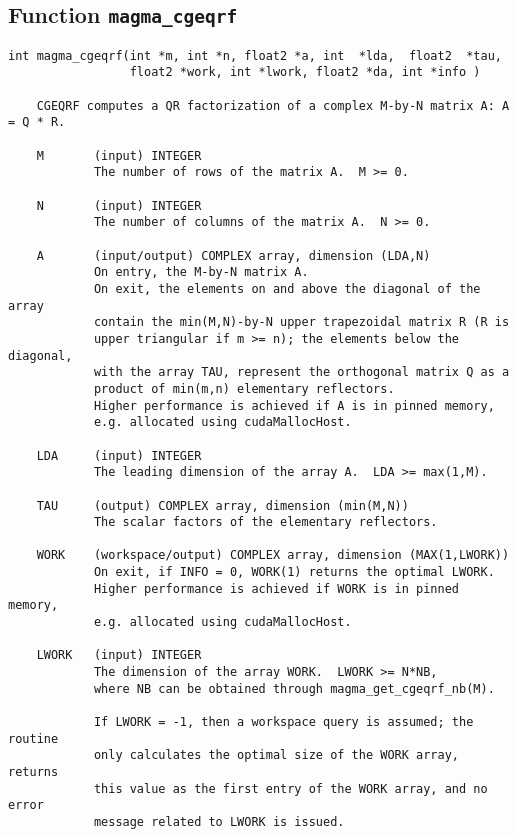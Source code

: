 \documentclass[10pt]{book}
\begin{document}
\subsection{Function {\tt {\bf magma\_cgeqrf}}}
\begin{verbatim}
int magma_cgeqrf(int *m, int *n, float2 *a, int  *lda,  float2  *tau,
                 float2 *work, int *lwork, float2 *da, int *info )
   
    CGEQRF computes a QR factorization of a complex M-by-N matrix A: A = Q * R.   

    M       (input) INTEGER   
            The number of rows of the matrix A.  M >= 0.   

    N       (input) INTEGER   
            The number of columns of the matrix A.  N >= 0.   

    A       (input/output) COMPLEX array, dimension (LDA,N)   
            On entry, the M-by-N matrix A.   
            On exit, the elements on and above the diagonal of the array   
            contain the min(M,N)-by-N upper trapezoidal matrix R (R is   
            upper triangular if m >= n); the elements below the diagonal,   
            with the array TAU, represent the orthogonal matrix Q as a   
            product of min(m,n) elementary reflectors.   
            Higher performance is achieved if A is in pinned memory, 
            e.g. allocated using cudaMallocHost.

    LDA     (input) INTEGER   
            The leading dimension of the array A.  LDA >= max(1,M).   

    TAU     (output) COMPLEX array, dimension (min(M,N))   
            The scalar factors of the elementary reflectors.   

    WORK    (workspace/output) COMPLEX array, dimension (MAX(1,LWORK))   
            On exit, if INFO = 0, WORK(1) returns the optimal LWORK.   
            Higher performance is achieved if WORK is in pinned memory, 
            e.g. allocated using cudaMallocHost.

    LWORK   (input) INTEGER   
            The dimension of the array WORK.  LWORK >= N*NB, 
            where NB can be obtained through magma_get_cgeqrf_nb(M).   

            If LWORK = -1, then a workspace query is assumed; the routine   
            only calculates the optimal size of the WORK array, returns   
            this value as the first entry of the WORK array, and no error   
            message related to LWORK is issued.


\end{verbatim}
\end{document}

